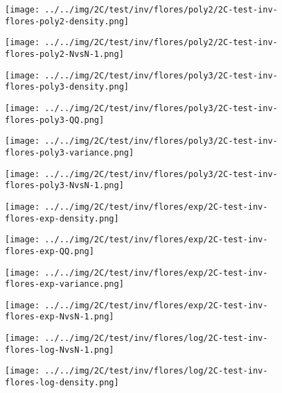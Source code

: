\begin{figure}[H]
\centering	\texttt{[image: ../../img/2C/test/inv/flores/poly2/2C-test-inv-flores-poly2-density.png]}
\end{figure}
\begin{figure}[H]
\centering	\texttt{[image: ../../img/2C/test/inv/flores/poly2/2C-test-inv-flores-poly2-NvsN-1.png]}
\end{figure}
\begin{figure}[H]
\centering	\texttt{[image: ../../img/2C/test/inv/flores/poly3/2C-test-inv-flores-poly3-density.png]}
\end{figure}
\begin{figure}[H]
\centering	\texttt{[image: ../../img/2C/test/inv/flores/poly3/2C-test-inv-flores-poly3-QQ.png]}
\end{figure}
\begin{figure}[H]
\centering	\texttt{[image: ../../img/2C/test/inv/flores/poly3/2C-test-inv-flores-poly3-variance.png]}
\end{figure}
\begin{figure}[H]
\centering	\texttt{[image: ../../img/2C/test/inv/flores/poly3/2C-test-inv-flores-poly3-NvsN-1.png]}
\end{figure}
\begin{figure}[H]
\centering	\texttt{[image: ../../img/2C/test/inv/flores/exp/2C-test-inv-flores-exp-density.png]}
\end{figure}
\begin{figure}[H]
\centering	\texttt{[image: ../../img/2C/test/inv/flores/exp/2C-test-inv-flores-exp-QQ.png]}
\end{figure}
\begin{figure}[H]
\centering	\texttt{[image: ../../img/2C/test/inv/flores/exp/2C-test-inv-flores-exp-variance.png]}
\end{figure}
\begin{figure}[H]
\centering	\texttt{[image: ../../img/2C/test/inv/flores/exp/2C-test-inv-flores-exp-NvsN-1.png]}
\end{figure}
\begin{figure}[H]
\centering	\texttt{[image: ../../img/2C/test/inv/flores/log/2C-test-inv-flores-log-NvsN-1.png]}
\end{figure}
\begin{figure}[H]
\centering	\texttt{[image: ../../img/2C/test/inv/flores/log/2C-test-inv-flores-log-density.png]}
\end{figure}
